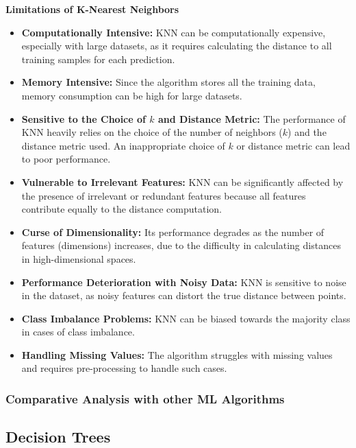 \documentclass[letterpaper,10pt]{article}
\begin{document}
\textbf{Limitations of K-Nearest Neighbors}

\begin{itemize}
    \item \textbf{Computationally Intensive:} KNN can be computationally expensive, especially with large datasets, as it requires calculating the distance to all training samples for each prediction.

    \item \textbf{Memory Intensive:} Since the algorithm stores all the training data, memory consumption can be high for large datasets.

    \item \textbf{Sensitive to the Choice of \( k \) and Distance Metric:} The performance of KNN heavily relies on the choice of the number of neighbors (\( k \)) and the distance metric used. An inappropriate choice of \( k \) or distance metric can lead to poor performance.

    \item \textbf{Vulnerable to Irrelevant Features:} KNN can be significantly affected by the presence of irrelevant or redundant features because all features contribute equally to the distance computation.

    \item \textbf{Curse of Dimensionality:} Its performance degrades as the number of features (dimensions) increases, due to the difficulty in calculating distances in high-dimensional spaces.

    \item \textbf{Performance Deterioration with Noisy Data:} KNN is sensitive to noise in the dataset, as noisy features can distort the true distance between points.

    \item \textbf{Class Imbalance Problems:} KNN can be biased towards the majority class in cases of class imbalance.

    \item \textbf{Handling Missing Values:} The algorithm struggles with missing values and requires pre-processing to handle such cases.
\end{itemize}
\subsubsection{Comparative Analysis with other ML Algorithms}

\newpage
\subsection{Decision Trees}
\end{document}
